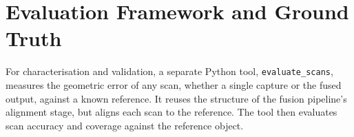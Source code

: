 \section{Evaluation Framework and Ground Truth}
\label{sec:eval_framework}

For characterisation and validation, a separate Python tool, \texttt{evaluate\_scans}, measures the geometric error of any scan, whether a single capture or the fused output, against a known reference. It reuses the structure of the fusion pipeline's alignment stage, but aligns each scan to the reference. The tool then evaluates scan accuracy and coverage against the reference object.

%
%
